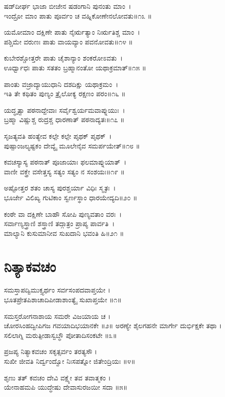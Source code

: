 ಷಡ್‌ದೀರ್ಘ ಭಾಜಾ ಬೀಜೇನ ಷಡಂಗಾನಿ ಪುನಂತು ಮಾಂ~।\\
ಇಂದ್ರೋ ಮಾಂ ಪಾತು ಪೂರ್ವಂ ಚ ವಹ್ನಿಕೋಣೇನಲೋವತು॥೧೩ ॥

ಯಮೋಮಾಂ ದಕ್ಷಿಣೇ ಪಾತು ನೈರ್ಋತ್ಯಾಂ ನಿರ್ಋತಿಶ್ಚ ಮಾಂ~।\\
ಪಶ್ಚಿಮೇ ವರುಣಃ ಪಾತು ವಾಯವ್ಯಾಂ ಪವನೋವತು॥೧೪ ॥

ಕುಬೇರಶ್ಚೋತ್ತರೇ ಪಾತು ಚೈಶಾನ್ಯಾಂ ಶಂಕರೋಽವತು~।\\
ಊರ್ಧ್ವಾಧಃ ಪಾತು ಸತತಂ ಬ್ರಹ್ಮಾನಂತೋ ಯಥಾಕ್ರಮಾತ್॥೧೫ ॥

ಪಾಂತು ವಜ್ರಾದ್ಯಾಯುಧಾನಿ ದಶದಿಕ್ಷು ಯಥಾಕ್ರಮಂ~।\\
ಇತಿ ತೇ ಕಥಿತಂ ಪುಣ್ಯಂ ತ್ರೈಲೋಕ್ಯ ರಕ್ಷಣಂ ಪರಂ॥೧೬ ॥

ಯದ್ಧೃತ್ವಾ ಪಠನಾದ್ದೇವಾಃ ಸರ್ವೈಶ್ವರ್ಯಮವಾಪ್ನುಯುಃ~।\\
ಬ್ರಹ್ಮಾ ವಿಷ್ಣುಶ್ಚ ರುದ್ರಶ್ಚ ಧಾರಣಾತ್ ಪಠನಾದ್ಯತಃ॥೧೭ ॥

ಸೃಜತ್ಯವತಿ ಹಂತ್ಯೇವ ಕಲ್ಪೇ ಕಲ್ಪೇ ಪೃಥಕ್ ಪೃಥಕ್~।\\
ಪುಷ್ಪಾಂಜಲ್ಯಷ್ಟಕಂ ದೇವ್ಯೈ ಮೂಲೇನೈವ ಸಮರ್ಪಯೇತ್॥೧೮ ॥

ಕವಚಸ್ಯಾಸ್ಯ ಪಠನಾತ್ ಪೂಜಾಯಾಃ ಫಲಮಾಪ್ನುಯಾತ್~।\\
ವಾಣೀ ವಕ್ತ್ರೇ ವಸೇತ್ತಸ್ಯ ಸತ್ಯಂ ಸತ್ಯಂ ನ ಸಂಶಯಃ॥೧೯ ॥

ಅಷ್ಟೋತ್ತರ ಶತಂ ಚಾಸ್ಯ ಪುರಶ್ಚರ್ಯಾ ವಿಧಿಃ ಸ್ಮೃತಃ~।\\
ಭೂರ್ಜೇ ವಿಲಿಖ್ಯ ಗುಟಿಕಾಂ ಸ್ವರ್ಣಸ್ಥಾಂ ಧಾರಯೇದ್ಯದಿ॥೨೦ ॥

ಕಂಠೇ ವಾ ದಕ್ಷಿಣೇ ಬಾಹೌ ಸೋಪಿ ಪುಣ್ಯವತಾಂ ವರಃ~।\\
ಸರ್ವಾಣ್ಯಸ್ತ್ರಾಣಿ ಶಸ್ತ್ರಾಣಿ ತದ್ಗಾತ್ರಂ ಪ್ರಾಪ್ಯ ಪಾರ್ವತಿ~।\\
ಮಾಲ್ಯಾನಿ ಕುಸುಮಾನೀವ ಸುಖದಾನಿ ಭವಂತಿ ಹಿ॥೨೧ ॥
\section{ನಿತ್ಯಾಕವಚಂ}
ಸಮಸ್ತಾಪದ್ವಿಮುಕ್ತ್ಯರ್ಥಂ ಸರ್ವಸಂಪದವಾಪ್ತಯೇ ।\\
ಭೂತಪ್ರೇತಪಿಶಾಚಾದಿಪೀಡಾಶಾಂತ್ಯೈ ಸುಖಾಪ್ತಯೇ ॥೧॥

ಸಮಸ್ತರೋಗನಾಶಾಯ ಸಮರೇ ವಿಜಯಾಯ ಚ ।\\
ಚೋರಸಿಂಹದ್ವೀಪಿಗಜ ಗವಯಾದಿಭಯಾನಕೇ ॥೨॥
\newpage
ಅರಣ್ಯೇ ಶೈಲಗಹನೇ ಮಾರ್ಗೇ ದುರ್ಭಿಕ್ಷಕೇ ತಥಾ ।\\
ಸಲಿಲಾಗ್ನಿ ಮರುತ್ಪೀಡಾಸ್ವಬ್ಧೌ ಪೋತಾದಿಸಂಕಟೇ ॥೩॥

ಪ್ರಜಪ್ಯ ನಿತ್ಯಾಕವಚಂ ಸಕೃತ್ಸರ್ವಂ ತರತ್ಯಸೌ ।\\
ಸುಖೀ ಜೀವತಿ ನಿರ್ದ್ವಂದ್ವೋ ನಿಃಸಪತ್ನೋ ಜಿತೇಂದ್ರಿಯಃ ॥೪॥

ಶೃಣು ತತ್ ಕವಚಂ ದೇವಿ ವಕ್ಷ್ಯೇ ತವ ತವಾತ್ಮಕಂ ।\\
ಯೇನಾಹಮಪಿ ಯುದ್ಧೇಷು ದೇವಾಸುರಜಯೀ ಸದಾ ॥೫॥

